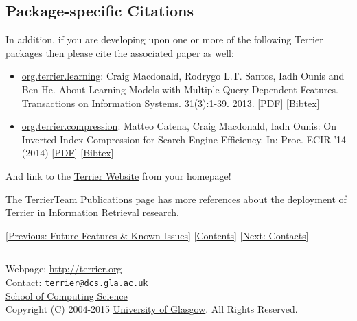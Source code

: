 \subsection{Package-specific
Citations}\label{package-specific-citations}

In addition, if you are developing upon one or more of the following
Terrier packages then please cite the associated paper as well:

\begin{itemize}
\tightlist
\item
  \href{javadoc/org/terrier/learning/package-summary.html}{org.terrier.learning}:
  Craig Macdonald, Rodrygo L.T. Santos, Iadh Ounis and Ben He. About
  Learning Models with Multiple Query Dependent Features. Transactions
  on Information Systems. 31(3):1-39. 2013.
  {[}\href{http://www.dcs.gla.ac.uk/~craigm/publications/macdonald13multquerydf.pdf}{PDF}{]}
  {[}\href{http://dl.acm.org/citation.cfm?id=2493176}{Bibtex}{]}
\item
  \href{javadoc/org/terrier/compression/package-summary.html}{org.terrier.compression}:
  Matteo Catena, Craig Macdonald, Iadh Ounis: On Inverted Index
  Compression for Search Engine Efficiency. In: Proc. ECIR '14 (2014)
  {[}\href{http://www.dcs.gla.ac.uk/~craigm/publications/catena14compression.pdf}{PDF}{]}
  {[}\href{http://link.springer.com/chapter/10.1007\%2F978-3-319-06028-6_30\#}{Bibtex}{]}
\end{itemize}

And link to the \href{http://terrier.org/}{Terrier Website} from your
homepage!

The
\href{http://terrierteam.dcs.gla.ac.uk/publications.html}{TerrierTeam
Publications} page has more references about the deployment of Terrier
in Information Retrieval research.

{[}\href{todo.html}{Previous: Future Features \& Known Issues}{]}
{[}\href{index.html}{Contents}{]} {[}\href{contacts.html}{Next:
Contacts}{]}

\begin{center}\rule{0.5\linewidth}{\linethickness}\end{center}

Webpage: \url{http://terrier.org}\\
Contact:
\href{mailto:terrier@dcs.gla.ac.uk}{\nolinkurl{terrier@dcs.gla.ac.uk}}\\
\href{http://www.dcs.gla.ac.uk/}{School of Computing Science}\\
Copyright (C) 2004-2015 \href{http://www.gla.ac.uk/}{University of
Glasgow}. All Rights Reserved.
